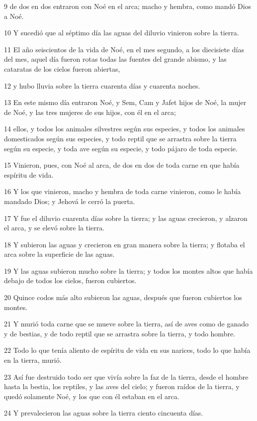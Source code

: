 9 de dos en dos entraron con Noé en el arca; macho y hembra, como mandó Dios a Noé.

10 Y sucedió que al séptimo día las aguas del diluvio vinieron sobre la tierra.

11 El año seiscientos de la vida de Noé, en el mes segundo, a los diecisiete días del mes, aquel día fueron rotas todas las fuentes del grande abismo, y las cataratas de los cielos fueron abiertas,

12 y hubo lluvia sobre la tierra cuarenta días y cuarenta noches.

13 En este mismo día entraron Noé, y Sem, Cam y Jafet hijos de Noé, la mujer de Noé, y las tres mujeres de sus hijos, con él en el arca;

14 ellos, y todos los animales silvestres según sus especies, y todos los animales domesticados según sus especies, y todo reptil que se arrastra sobre la tierra según su especie, y toda ave según su especie, y todo pájaro de toda especie.

15 Vinieron, pues, con Noé al arca, de dos en dos de toda carne en que había espíritu de vida.

16 Y los que vinieron, macho y hembra de toda carne vinieron, como le había mandado Dios; y Jehová le cerró la puerta.

17 Y fue el diluvio cuarenta días sobre la tierra; y las aguas crecieron, y alzaron el arca, y se elevó sobre la tierra.

18 Y subieron las aguas y crecieron en gran manera sobre la tierra; y flotaba el arca sobre la superficie de las aguas.

19 Y las aguas subieron mucho sobre la tierra; y todos los montes altos que había debajo de todos los cielos, fueron cubiertos.

20 Quince codos más alto subieron las aguas, después que fueron cubiertos los montes.

21 Y murió toda carne que se mueve sobre la tierra, así de aves como de ganado y de bestias, y de todo reptil que se arrastra sobre la tierra, y todo hombre.

22 Todo lo que tenía aliento de espíritu de vida en sus narices, todo lo que había en la tierra, murió.

23 Así fue destruido todo ser que vivía sobre la faz de la tierra, desde el hombre hasta la bestia, los reptiles, y las aves del cielo; y fueron raídos de la tierra, y quedó solamente Noé, y los que con él estaban en el arca.

24 Y prevalecieron las aguas sobre la tierra ciento cincuenta días.

